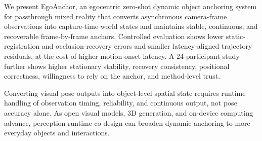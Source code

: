 \documentclass[review]{vgtc}
\begin{document}
We present EgoAnchor, an egocentric zero-shot dynamic object anchoring system for passthrough mixed reality that converts asynchronous camera-frame observations into capture-time world states and maintains stable, continuous, and recoverable frame-by-frame anchors. Controlled evaluation shows lower static-registration and occlusion-recovery errors and smaller latency-aligned trajectory residuals, at the cost of higher motion-onset latency. A 24-participant study further shows higher stationary stability, recovery consistency, positional correctness, willingness to rely on the anchor, and method-level trust.

Converting visual pose outputs into object-level spatial state requires runtime handling of observation timing, reliability, and continuous output, not pose accuracy alone. As open visual models, 3D generation, and on-device computing advance, perception-runtime co-design can broaden dynamic anchoring to more everyday objects and interactions.




\end{document}
